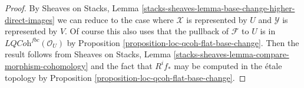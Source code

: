 \documentclass[10pt,a4paper]{amsart}
\theoremstyle{plain}
\theoremstyle{definition}
\theoremstyle{remark}
\numberwithin{equation}{subsection}
\begin{document}
\begin{proof}
By Sheaves on Stacks, Lemma
\ref{stacks-sheaves-lemma-base-change-higher-direct-images}
we can reduce to the case where $\mathcal{X}$
is represented by $U$ and $\mathcal{Y}$ is
represented by $V$. Of course this also uses that the pullback of
$\mathcal{F}$ to $U$ is in $\textit{LQCoh}^{fbc}(\mathcal{O}_U)$
by Proposition \ref{proposition-loc-qcoh-flat-base-change}.
Then the result follows from
Sheaves on Stacks, Lemma
\ref{stacks-sheaves-lemma-compare-morphism-cohomology}
and the fact that $R^if_*$ may be computed in the
\'etale topology by
Proposition \ref{proposition-loc-qcoh-flat-base-change}.
\end{proof}
\end{document}
